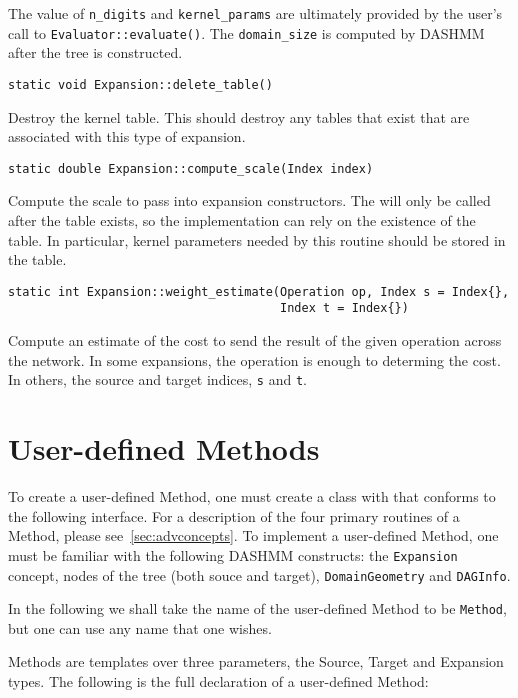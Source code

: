 The value of \texttt{n\_digits} and \texttt{kernel\_params} are ultimately
provided by the user's call to \texttt{Evaluator::evaluate()}. The
\texttt{domain\_size} is computed by DASHMM after the tree is constructed.

\begin{lstlisting}
static void Expansion::delete_table()
\end{lstlisting}

Destroy the kernel table. This should destroy any tables that exist that are
associated with this type of expansion.

\begin{lstlisting}
static double Expansion::compute_scale(Index index)
\end{lstlisting}


Compute the scale to pass into expansion constructors. The will only be called
after the table exists, so the implementation can rely on the existence of the
table. In particular, kernel parameters needed by this routine should be
stored in the table.

\begin{lstlisting}
static int Expansion::weight_estimate(Operation op, Index s = Index{}, 
                                      Index t = Index{})
\end{lstlisting}


Compute an estimate of the cost to send the result of the given operation
across the network. In some expansions, the operation is enough to determing
the cost. In others, the source and target indices, \texttt{s} and \texttt{t}.



\section{User-defined Methods}

To create a user-defined Method, one must create a class with that conforms
to the following interface. For a description of the four primary routines
of a Method, please see~\ref{sec:advconcepts}. To implement a user-defined
Method, one must be familiar with the following DASHMM constructs: the
\texttt{Expansion} concept, nodes of the tree (both souce and target),
\texttt{DomainGeometry} and \texttt{DAGInfo}.

In the following we shall take the name of the user-defined Method to be
\texttt{Method}, but one can use any name that one wishes.

Methods are templates over three parameters, the Source, Target and Expansion
types. The following is the full declaration of a user-defined Method:

